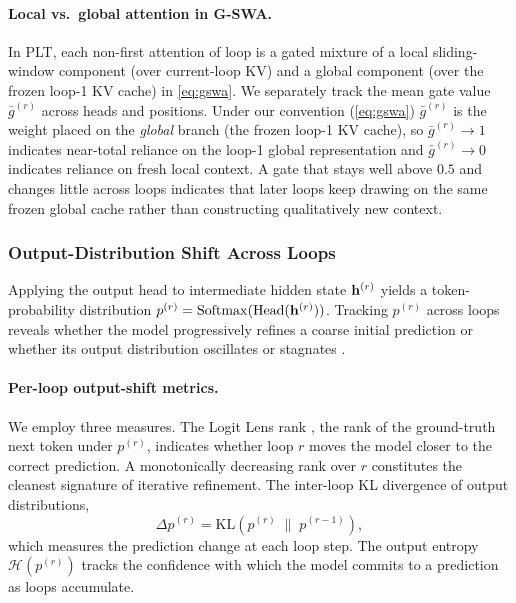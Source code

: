 \paragraph{Local vs.\ global attention in G-SWA.}
In PLT, each non-first attention of loop is a gated mixture of a local
sliding-window component (over current-loop KV) and a global component
(over the frozen loop-1 KV cache) in \autoref{eq:gswa}.
We separately track the mean gate value $\bar{g}^{(r)}$ across heads and
positions. Under our convention (\autoref{eq:gswa}) $\bar{g}^{(r)}$ is the
weight placed on the \emph{global} branch (the frozen loop-1 KV cache), so
$\bar{g}^{(r)}\!\to\!1$ indicates near-total reliance on the loop-1 global
representation and $\bar{g}^{(r)}\!\to\!0$ indicates reliance on fresh local
context.
A gate that stays well above $0.5$ and changes little across loops indicates
that later loops keep drawing on the same frozen global cache rather than
constructing qualitatively new context.

\subsubsection{Output-Distribution Shift Across Loops}
\label{sec:analysis-output}

Applying the output head to intermediate hidden state $\mathbf{h}^{(r)}$ yields
a token-probability distribution
$p^{(r)} = \mathrm{Softmax}(\mathrm{Head}(\mathbf{h}^{(r)}))$.
Tracking $p^{(r)}$ across loops reveals whether the model progressively
refines a coarse initial prediction or whether its output distribution
oscillates or stagnates \citep{chen2026loop}.

\paragraph{Per-loop output-shift metrics.}
We employ three measures.
The Logit Lens rank \citep{lu2025latent}, the rank of the ground-truth
next token under $p^{(r)}$, indicates whether loop $r$ moves the model
closer to the correct prediction. A monotonically decreasing rank over $r$
constitutes the cleanest signature of iterative refinement.
The inter-loop KL divergence of output distributions,
\begin{equation}
  \Delta p^{(r)} = \mathrm{KL}\!\left(p^{(r)} \;\|\; p^{(r-1)}\right),
  \label{eq:output-shift}
\end{equation}
which measures the prediction change at each loop step.
The output entropy $\mathcal{H}(p^{(r)})$ tracks the confidence with which
the model commits to a prediction as loops accumulate.

